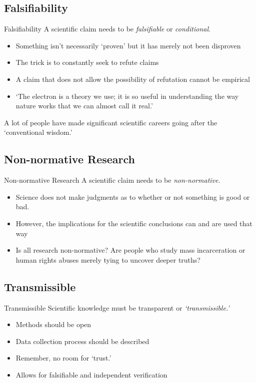 \documentclass{beamer}
\begin{document}
\subsection{Falsifiability}
\begin{frame}{Falsifiability}
A scientific claim needs to be \textit{falsifiable} or \textit{conditional}.
\begin{itemize}
\item Something isn't necessarily `proven' but it has merely not been disproven
\item The trick is to constantly seek to refute claims
\item A claim that does not allow the possibility of refutation cannot be empirical
\item `The electron is a theory we use; it is so useful in understanding the way nature works that we can almost call it real.'
\end{itemize}
A lot of people have made significant scientific careers going after the `conventional wisdom.'
\end{frame}
\subsection{Non-normative Research}
\begin{frame}{Non-normative Research}
A scientific claim needs to be \textit{non-normative.}
\begin{itemize}
\item Science does not make judgments as to whether or not something is good or bad.
\item However, the implications for the scientific conclusions can and are used that way 
\item Is all research non-normative? Are people who study mass incarceration or human rights abuses merely tying to uncover deeper truths?
\end{itemize}
\end{frame}
\subsection{Transmissible}
\begin{frame}{Transmissible}
Scientific knowledge must be transparent or \textit{`transmissible.'}
\begin{itemize}
\item Methods should be open
\item Data collection process should be described
\item Remember, no room for `trust.'
\item Allows for falsifiable and independent verification
\end{itemize}
\end{frame}
\end{document}
